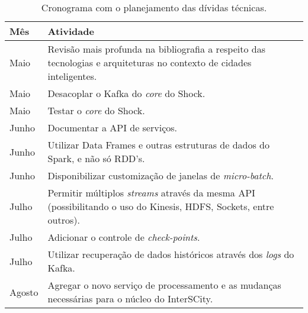 \begin{table}[h]
  \begin{center}
    \begin{tabular}{|l| p{12cm}|}
        \hline \textbf{Mês} & \textbf{Atividade} \\

        \hline Maio & Revisão mais profunda na bibliografia a respeito das
        tecnologias e arquiteturas no contexto de cidades inteligentes.\\

        \hline Maio & Desacoplar o Kafka do \textit{core} do Shock. \\

        \hline Maio & Testar o \textit{core} do Shock. \\

        \hline Junho & Documentar a API de serviços. \\

        \hline Junho & Utilizar Data Frames e outras estruturas de dados do
        Spark, e não só RDD's. \\

        \hline Junho & Disponibilizar customização de janelas de
        \textit{micro-batch}. \\

        \hline Julho & Permitir múltiplos \textit{streams} através da mesma
        API (possibilitando o uso do Kinesis, HDFS, Sockets, entre outros). \\

        \hline Julho & Adicionar o controle de \textit{check-points}. \\

        \hline Julho & Utilizar recuperação de dados históricos através dos
        \textit{logs} do Kafka. \\

        \hline Agosto & Agregar o novo serviço de processamento e as mudanças
        necessárias para o núcleo do InterSCity. \\

      \hline
    \end{tabular}
  \end{center}
  \caption{Cronograma com o planejamento das dívidas técnicas.}
  \label{tab:cronograma}
\end{table}
